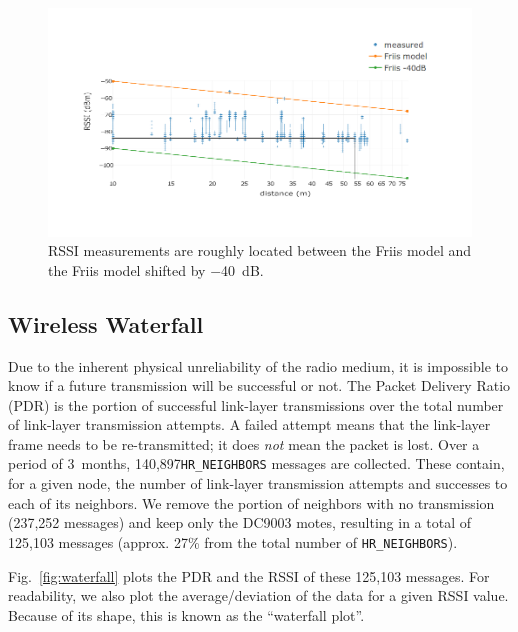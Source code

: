 \documentclass{sig-alternate}
\newcommand{\HRNEIGHBORS}         {{\tt HR\_NEIGHBORS}\xspace}
\newcommand{\NUMHRNEIGHBORS}      {140,897\xspace}
\begin{document}
\begin{figure}
    \centering
    \includegraphics[width=\columnwidth]{pister_hack}
    \caption{RSSI measurements are roughly located between the Friis model and the Friis model shifted by $-$40~dB.}
    \label{fig:pister_hack}
\end{figure}

\subsection{Wireless Waterfall}
\label{sec:waterfall}


Due to the inherent physical unreliability of the radio medium, it is impossible to know if a future transmission will be successful or not.
The Packet Delivery Ratio (PDR) is the portion of successful link-layer transmissions over the total number of link-layer transmission attempts.
A failed attempt means that the link-layer frame needs to be re-transmitted; it does \textit{not} mean the packet is lost.
Over a period of 3~months, \NUMHRNEIGHBORS \HRNEIGHBORS messages are collected.
These contain, for a given node, the number of link-layer transmission attempts and successes to each of its neighbors.
We remove the portion of neighbors with no transmission (237,252 messages) and keep only the DC9003 motes, resulting in a total of 125,103 messages (approx. 27\% from the total number of \HRNEIGHBORS).


Fig.~\ref{fig:waterfall} plots the PDR and the RSSI of these 125,103 messages.
For readability, we also plot the average/deviation of the data for a given RSSI value.
Because of its shape, this is known as the ``waterfall plot''.
\end{document}
